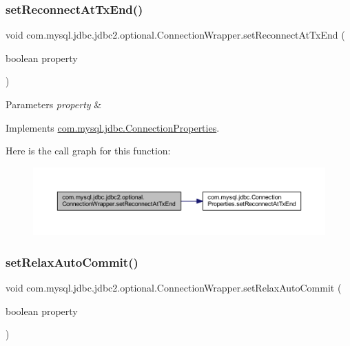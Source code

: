 \subsubsection{\texorpdfstring{set\+Reconnect\+At\+Tx\+End()}{setReconnectAtTxEnd()}}
{\footnotesize\ttfamily void com.\+mysql.\+jdbc.\+jdbc2.\+optional.\+Connection\+Wrapper.\+set\+Reconnect\+At\+Tx\+End (\begin{DoxyParamCaption}\item[{boolean}]{property }\end{DoxyParamCaption})}


\begin{DoxyParams}{Parameters}
{\em property} & \\
\hline
\end{DoxyParams}


Implements \mbox{\hyperlink{interfacecom_1_1mysql_1_1jdbc_1_1_connection_properties_a60491800609ee12f89f5545a9e26db4c}{com.\+mysql.\+jdbc.\+Connection\+Properties}}.

Here is the call graph for this function\+:
\nopagebreak
\begin{figure}[H]
\begin{center}
\leavevmode
\includegraphics[width=350pt]{classcom_1_1mysql_1_1jdbc_1_1jdbc2_1_1optional_1_1_connection_wrapper_a54004b1b90728b482c4bb555a76dbb29_cgraph}
\end{center}
\end{figure}
\mbox{\label{classcom_1_1mysql_1_1jdbc_1_1jdbc2_1_1optional_1_1_connection_wrapper_af338a10a5b9e993703c9e21810e74b21}} 
\subsubsection{\texorpdfstring{set\+Relax\+Auto\+Commit()}{setRelaxAutoCommit()}}
{\footnotesize\ttfamily void com.\+mysql.\+jdbc.\+jdbc2.\+optional.\+Connection\+Wrapper.\+set\+Relax\+Auto\+Commit (\begin{DoxyParamCaption}\item[{boolean}]{property }\end{DoxyParamCaption})}


